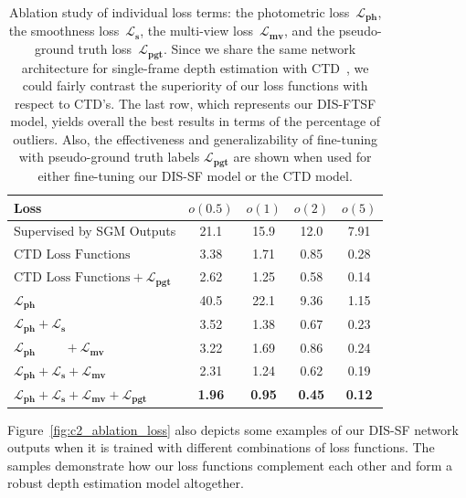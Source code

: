 \begin{table}[t]
    \begin{center}
        \begin{tabular}{lcccc}
        \hline
        Loss & $o(0.5)$ & $o(1)$ & $o(2)$ & $o(5)$\\
        \hline
        Supervised by SGM Outputs & 21.1 & 15.9 & 12.0 & 7.91\\
        $\text{CTD Loss Functions}$ & 3.38 & 1.71 & 0.85 & 0.28\\
        $\text{CTD Loss Functions} + \boldsymbol{\mathcal{L}_{pgt}}$ & 2.62 & 1.25 & 0.58 & 0.14\\        
        $\boldsymbol{\mathcal{L}_{ph}}$ & 40.5 & 22.1 & 9.36 & 1.15\\
        $\boldsymbol{\mathcal{L}_{ph}} + \boldsymbol{\mathcal{L}_s}$ & 3.52 & 1.38 & 0.67 & 0.23\\
        $\boldsymbol{\mathcal{L}_{ph}} \phantom{IILL} + \boldsymbol{\mathcal{L}_{mv}}$ & 3.22 & 1.69 & 0.86 & 0.24\\
        $\boldsymbol{\mathcal{L}_{ph}} + \boldsymbol{\mathcal{L}_s} + \boldsymbol{\mathcal{L}_{mv}}$ & 2.31 & 1.24 & 0.62 & 0.19\\
        $\boldsymbol{\mathcal{L}_{ph}} + \boldsymbol{\mathcal{L}_s} + \boldsymbol{\mathcal{L}_{mv}} + \boldsymbol{\mathcal{L}_{pgt}}$ & \textbf{1.96} & \textbf{0.95} & \textbf{0.45} & \textbf{0.12}\\
        \hline
        \end{tabular}
    \end{center}
    \caption{Ablation study of individual loss terms: the photometric loss~$\boldsymbol{\mathcal{L}_{ph}}$, the smoothness loss~$\boldsymbol{\mathcal{L}_{s}}$, the multi-view loss~$\boldsymbol{\mathcal{L}_{mv}}$, and the pseudo-ground truth loss~$\boldsymbol{\mathcal{L}_{pgt}}$. Since we share the same network architecture for single-frame depth estimation with CTD~\citep{riegler2019connecting},  we could fairly contrast the superiority of our loss functions with respect to CTD's. The last row, which represents our DIS-FTSF model, yields overall the best results in terms of the percentage of outliers. Also, the effectiveness and generalizability of fine-tuning with pseudo-ground truth labels $\boldsymbol{\mathcal{L}_{pgt}}$ are shown when used for either fine-tuning our DIS-SF model or the CTD model.}
    \label{table:ablation_dis_sf_loss}
\end{table}

Figure~\ref{fig:c2_ablation_loss} also depicts some examples of our DIS-SF network outputs when it is trained with different combinations of loss functions. The samples demonstrate how our loss functions complement each other and form a robust depth estimation model altogether.


